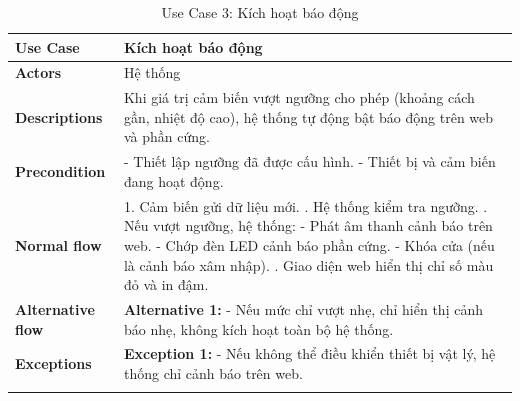 \begin{longtable}{|p{}|p{}|}
    \hline
    \textbf{Use Case}         & Kích hoạt báo động                                                                                                              \\
    \hline
    \textbf{Actors}           & Hệ thống                                                                                                                        \\
    \hline
    \textbf{Descriptions}     & Khi giá trị cảm biến vượt ngưỡng cho phép (khoảng cách gần, nhiệt độ cao), hệ thống tự động bật báo động trên web và phần cứng. \\
    \hline
    \textbf{Precondition}     &
    - Thiết lập ngưỡng đã được cấu hình. \newline
    - Thiết bị và cảm biến đang hoạt động.                                                                                                                      \\
    \hline
    \textbf{Normal flow}      &
    1. Cảm biến gửi dữ liệu mới. \newline
    2. Hệ thống kiểm tra ngưỡng. \newline
    3. Nếu vượt ngưỡng, hệ thống: \newline
    \quad - Phát âm thanh cảnh báo trên web. \newline
    \quad - Chớp đèn LED cảnh báo phần cứng. \newline
    \quad - Khóa cửa (nếu là cảnh báo xâm nhập). \newline
    4. Giao diện web hiển thị chỉ số màu đỏ và in đậm.                                                                                                          \\
    \hline
    \textbf{Alternative flow} &
    \textbf{Alternative 1:} \newline
    - Nếu mức chỉ vượt nhẹ, chỉ hiển thị cảnh báo nhẹ, không kích hoạt toàn bộ hệ thống.                                                                        \\
    \hline
    \textbf{Exceptions}       &
    \textbf{Exception 1:} \newline
    - Nếu không thể điều khiển thiết bị vật lý, hệ thống chỉ cảnh báo trên web.                                                                                 \\
    \hline
    \caption{Use Case 3: Kích hoạt báo động}
    \label{tab:usecase3}
\end{longtable}



